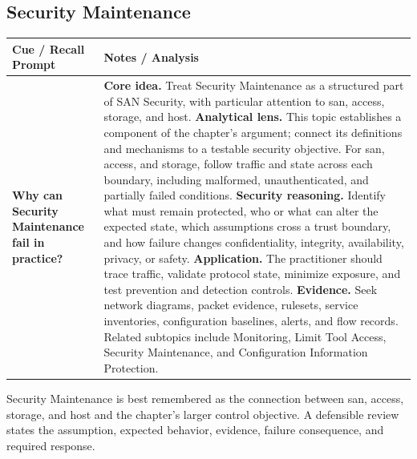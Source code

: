 \documentclass[11pt]{article}
\newcommand{\CornellHeader}{%
\rowcolor{Navy}\color{white}\bfseries Cue / Recall Prompt & \color{white}\bfseries Notes / Analysis\\\hline}
\newcommand{\CornellRow}[2]{%
\cellcolor{CueGray}\RaggedRight\textbf{#1} & \RaggedRight #2\\\hline}
\begin{document}
\subsection*{Security Maintenance}
\begin{longtable}{>{\RaggedRight\arraybackslash}p{}|>{\RaggedRight\arraybackslash}p{}}
\CornellHeader
\CornellRow{Why can Security Maintenance fail in practice?}{\textbf{Core idea.} Treat Security Maintenance as a structured part of SAN Security, with particular attention to san, access, storage, and host. \textbf{Analytical lens.} This topic establishes a component of the chapter's argument; connect its definitions and mechanisms to a testable security objective. For san, access, and storage, follow traffic and state across each boundary, including malformed, unauthenticated, and partially failed conditions. \textbf{Security reasoning.} Identify what must remain protected, who or what can alter the expected state, which assumptions cross a trust boundary, and how failure changes confidentiality, integrity, availability, privacy, or safety. \textbf{Application.} The practitioner should trace traffic, validate protocol state, minimize exposure, and test prevention and detection controls. \textbf{Evidence.} Seek network diagrams, packet evidence, rulesets, service inventories, configuration baselines, alerts, and flow records. Related subtopics include Monitoring, Limit Tool Access, Security Maintenance, and Configuration Information Protection.}
\end{longtable}
\begin{topicsummary}
Security Maintenance is best remembered as the connection between san, access, storage, and host and the chapter's larger control objective. A defensible review states the assumption, expected behavior, evidence, failure consequence, and required response.
\end{topicsummary}
\end{document}

